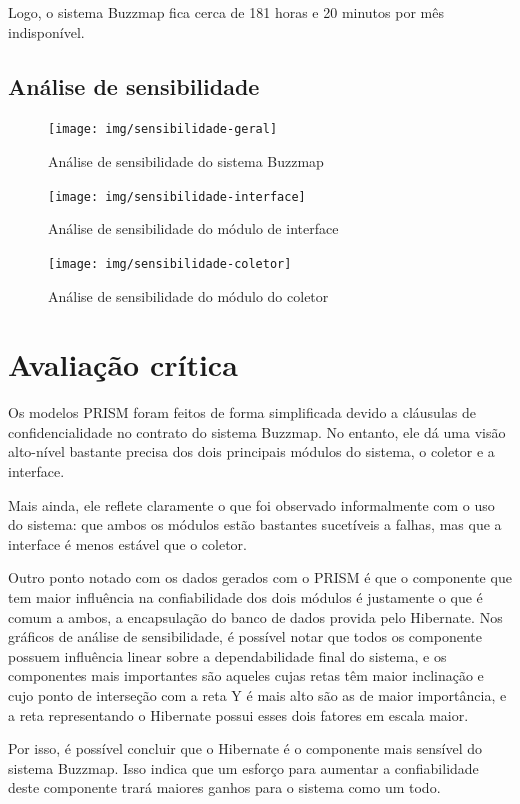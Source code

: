 Logo, o sistema Buzzmap fica cerca de 181 horas e 20 minutos por mês
indisponível.


\subsection{Análise de sensibilidade}

\begin{figure}[htbp]
\centering
\texttt{[image: img/sensibilidade-geral]}
\caption{Análise de sensibilidade do sistema Buzzmap}
\label{fig:sensibilidade-geral}
\end{figure}

\begin{figure}[htbp]
\centering
\texttt{[image: img/sensibilidade-interface]}
\caption{Análise de sensibilidade do módulo de interface}
\label{fig:sensibilidade-interface}
\end{figure}

\begin{figure}[htbp]
\centering
\texttt{[image: img/sensibilidade-coletor]}
\caption{Análise de sensibilidade do módulo do coletor}
\label{fig:sensibilidade-coletor}
\end{figure}

\section{Avaliação crítica}
Os modelos PRISM foram feitos de forma simplificada devido a cláusulas
de confidencialidade no contrato do sistema Buzzmap. No entanto, ele
dá uma visão alto-nível bastante precisa dos dois principais módulos
do sistema, o coletor e a interface.

Mais ainda, ele reflete claramente o que foi observado informalmente
com o uso do sistema: que ambos os módulos estão bastantes sucetíveis
a falhas, mas que a interface é menos estável que o coletor.

Outro ponto notado com os dados gerados com o PRISM é que o componente
que tem maior influência na confiabilidade dos dois módulos é
justamente o que é comum a ambos, a encapsulação do banco de dados
provida pelo Hibernate. Nos gráficos de análise de sensibilidade, é
possível notar que todos os componente possuem influência linear sobre
a dependabilidade final do sistema, e os componentes mais importantes
são aqueles cujas retas têm maior inclinação e cujo ponto de
interseção com a reta Y é mais alto são as de maior importância, e a
reta representando o Hibernate possui esses dois fatores em escala
maior.

Por isso, é possível concluir que o Hibernate é o componente mais
sensível do sistema Buzzmap. Isso indica que um esforço para aumentar
a confiabilidade deste componente trará maiores ganhos para o sistema
como um todo.
